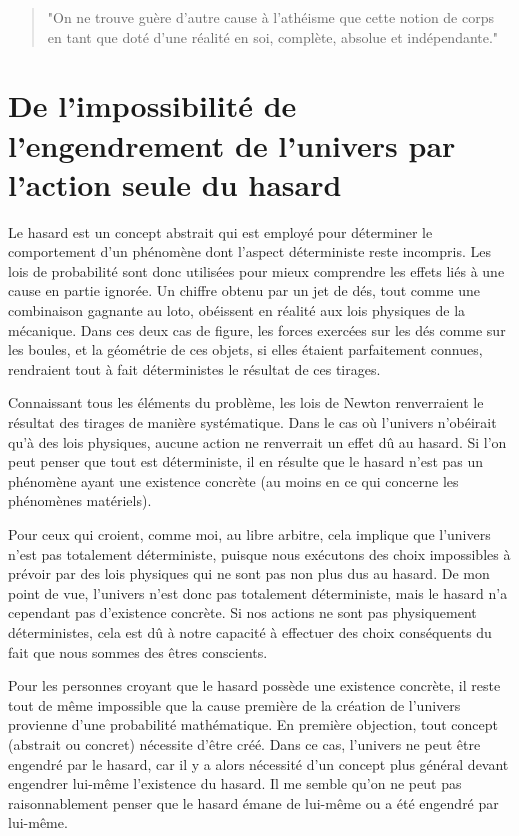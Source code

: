 \begin{center}
\begin{quote}
"On ne trouve guère d’autre cause à l’athéisme que cette notion de corps en tant que doté d’une réalité en soi, complète, absolue et indépendante."
\end{quote}
\end{center}


\chapter{De l’impossibilité de l’engendrement de l’univers par l’action seule du hasard}

Le hasard est un concept abstrait qui est employé pour déterminer le comportement d’un phénomène dont l’aspect déterministe reste incompris. Les lois de probabilité sont donc utilisées pour mieux comprendre les effets liés à une cause en partie ignorée. Un chiffre obtenu par un jet de dés, tout comme une combinaison gagnante au loto, obéissent en réalité aux lois physiques de la mécanique. Dans ces deux cas de figure, les forces exercées sur les dés comme sur les boules, et la géométrie de ces objets, si elles étaient parfaitement connues, rendraient tout à fait déterministes le résultat de ces tirages.

Connaissant tous les éléments du problème, les lois de Newton renverraient le résultat des tirages de manière systématique. Dans le cas où l’univers n’obéirait qu’à des lois physiques, aucune action ne renverrait un effet dû au hasard. Si l’on peut penser que tout est déterministe, il en résulte que le hasard n’est pas un phénomène ayant une existence concrète (au moins en ce qui concerne les phénomènes matériels).

Pour ceux qui croient, comme moi, au libre arbitre, cela implique que l’univers n’est pas totalement déterministe, puisque nous exécutons des choix impossibles à prévoir par des lois physiques qui ne sont pas non plus dus au hasard. De mon point de vue, l’univers n’est donc pas totalement déterministe, mais le hasard n’a cependant pas d’existence concrète. Si nos actions ne sont pas physiquement déterministes, cela est dû à notre capacité à effectuer des choix conséquents du fait que nous sommes des êtres conscients.

Pour les personnes croyant que le hasard possède une existence concrète, il reste tout de même impossible que la cause première de la création de l’univers provienne d’une probabilité mathématique. En première objection, tout concept (abstrait ou concret) nécessite d’être créé. Dans ce cas, l’univers ne peut être engendré par le hasard, car il y a alors nécessité d’un concept plus général devant engendrer lui-même l’existence du hasard. Il me semble qu’on ne peut pas raisonnablement penser que le hasard émane de lui-même ou a été engendré par lui-même.

